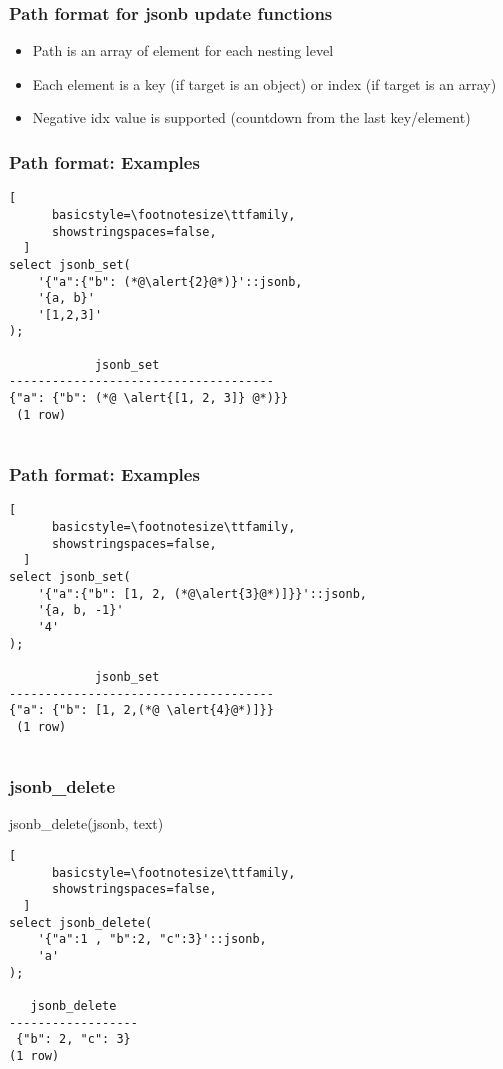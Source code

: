 \documentclass[14pt, compress]{beamer}
\begin{document}
\begin{frame}[fragile]
  \frametitle{Path format for jsonb update functions}

  \begin{itemize}
      \item[\MVRightarrow] Path is an array of element for each nesting level
      \item[\MVRightarrow] Each element is a key (if target is an object) or index (if target is an array)
      \item[\MVRightarrow] Negative idx value is supported (countdown from the last key/element)
  \end{itemize}

\end{frame}

\begin{frame}[fragile]
  \frametitle{Path format: Examples}

  \begin{lstlisting}[
      basicstyle=\footnotesize\ttfamily,
      showstringspaces=false,
  ]
select jsonb_set(
    '{"a":{"b": (*@\alert{2}@*)}'::jsonb,
    '{a, b}'
    '[1,2,3]'
);

            jsonb_set                                 
-------------------------------------
{"a": {"b": (*@ \alert{[1, 2, 3]} @*)}}
 (1 row)
 
  \end{lstlisting}

\end{frame}

\begin{frame}[fragile]
  \frametitle{Path format: Examples}

  \begin{lstlisting}[
      basicstyle=\footnotesize\ttfamily,
      showstringspaces=false,
  ]
select jsonb_set(
    '{"a":{"b": [1, 2, (*@\alert{3}@*)]}}'::jsonb,
    '{a, b, -1}'
    '4'
);

            jsonb_set                                 
-------------------------------------
{"a": {"b": [1, 2,(*@ \alert{4}@*)]}}
 (1 row)
 
  \end{lstlisting}

\end{frame}

\begin{frame}[fragile]
  \frametitle{jsonb\_delete}

  jsonb\_delete(jsonb, text)

  \begin{lstlisting}[
      basicstyle=\footnotesize\ttfamily,
      showstringspaces=false,
  ]
select jsonb_delete(
    '{"a":1 , "b":2, "c":3}'::jsonb,
    'a'
);

   jsonb_delete   
------------------
 {"b": 2, "c": 3}
(1 row)

  \end{lstlisting}
\end{frame}
\end{document}
